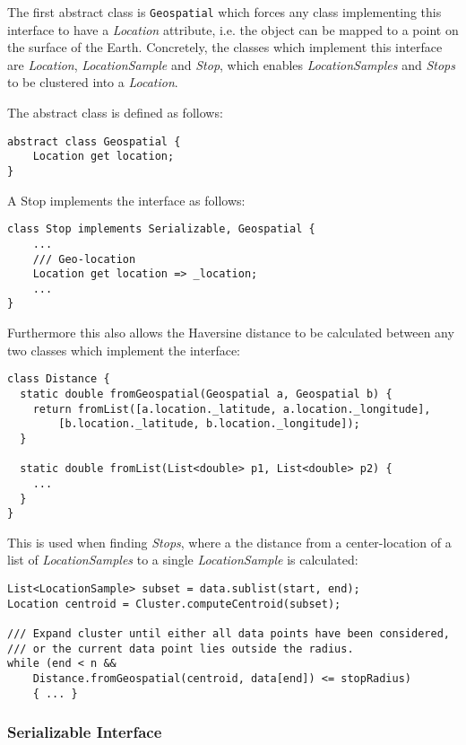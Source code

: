 The first abstract class is \verb|Geospatial| which forces any class implementing this interface to have a \textit{Location} attribute, i.e. the object can be mapped to a point on the surface of the Earth. Concretely, the classes which implement this interface are \textit{Location}, \textit{LocationSample} and \textit{Stop}, which enables \textit{LocationSamples} and \textit{Stops} to be clustered into a \textit{Location}.

The abstract class is defined as follows:
\begin{verbatim}
abstract class Geospatial {
    Location get location;
}
\end{verbatim}

A Stop implements the interface as follows:
\begin{verbatim}
class Stop implements Serializable, Geospatial { 
    ...
    /// Geo-location
    Location get location => _location;
    ...
}
\end{verbatim}

Furthermore this also allows the Haversine distance to be calculated between any two classes which implement the interface:

\begin{verbatim}
class Distance {
  static double fromGeospatial(Geospatial a, Geospatial b) {
    return fromList([a.location._latitude, a.location._longitude],
        [b.location._latitude, b.location._longitude]);
  }

  static double fromList(List<double> p1, List<double> p2) {
    ...
  }
}
\end{verbatim}

This is used when finding \textit{Stops}, where a the distance from a center-location of a list of \textit{LocationSamples} to a single \textit{LocationSample} is calculated:

\begin{verbatim}
List<LocationSample> subset = data.sublist(start, end);
Location centroid = Cluster.computeCentroid(subset);

/// Expand cluster until either all data points have been considered,
/// or the current data point lies outside the radius.
while (end < n && 
    Distance.fromGeospatial(centroid, data[end]) <= stopRadius) 
    { ... }
\end{verbatim}

\subsubsection{Serializable Interface}


